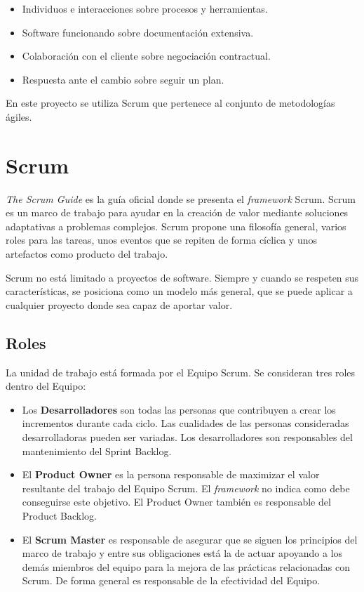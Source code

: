 \begin{itemize}
    \item Individuos e interacciones sobre procesos y herramientas.
    \item Software funcionando sobre documentación extensiva.
    \item Colaboración con el cliente sobre negociación contractual.
    \item Respuesta ante el cambio sobre seguir un plan.
\end{itemize}

En este proyecto se utiliza Scrum que pertenece al conjunto de metodologías ágiles.

\section{Scrum}

\emph{The Scrum Guide} es la guía oficial donde se presenta el \emph{framework} Scrum. Scrum es un marco de trabajo para ayudar en la creación de valor mediante soluciones adaptativas a problemas complejos. Scrum propone una filosofía general, varios roles para las tareas, unos eventos que se repiten de forma cíclica y unos artefactos como producto del trabajo.

Scrum no está limitado a proyectos de software. Siempre y cuando se respeten sus características, se posiciona como un modelo más general, que se puede aplicar a cualquier proyecto donde sea capaz de aportar valor.

\subsection{Roles}

La unidad de trabajo está formada por el Equipo Scrum. Se consideran tres roles dentro del Equipo:

\begin{itemize}
    \item Los \textbf{Desarrolladores} son todas las personas que contribuyen a crear los incrementos durante cada ciclo. Las cualidades de las personas consideradas desarrolladoras pueden ser variadas. Los desarrolladores son responsables del mantenimiento del Sprint Backlog.
    \item El \textbf{Product Owner} es la persona responsable de maximizar el valor resultante del trabajo del Equipo Scrum. El \emph{framework} no indica como debe conseguirse este objetivo. El Product Owner también es responsable del Product Backlog.
    \item El \textbf{Scrum Master} es responsable de asegurar que se siguen los principios del marco de trabajo y entre sus obligaciones está la de actuar apoyando a los demás miembros del equipo para la mejora de las prácticas relacionadas con Scrum. De forma general es responsable de la efectividad del Equipo.
\end{itemize}


